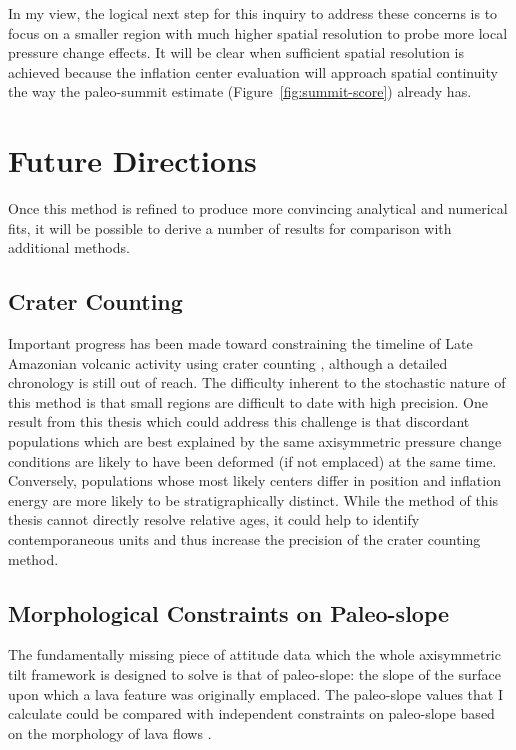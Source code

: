 In my view, the logical next step for this inquiry to address these concerns is to focus on a smaller region with much higher spatial resolution to probe more local pressure change effects. It will be clear when sufficient spatial resolution is achieved because the inflation center evaluation will approach spatial continuity the way the paleo-summit estimate (Figure~\ref{fig:summit-score}) already has.

\section{Future Directions}

Once this method is refined to produce more convincing analytical and numerical fits, it will be possible to derive a number of results for comparison with additional methods.

\subsection{Crater Counting}
Important progress has been made toward constraining the timeline of Late Amazonian volcanic activity using crater counting \parencite{kneissl_map-projection-independent_2011,robbins_volcanic_2011,
robbins_large_2013,
platz_crater-based_2013}, although a detailed chronology is still out of reach. The difficulty inherent to the stochastic nature of this method is that small regions are difficult to date with high precision. One result from this thesis which could address this challenge is that discordant populations which are best explained by the same axisymmetric pressure change conditions are likely to have been deformed (if not emplaced) at the same time. Conversely, populations whose most likely centers differ in position and inflation energy are more likely to be stratigraphically distinct. While the method of this thesis cannot directly resolve relative ages, it could help to identify contemporaneous units and thus increase the precision of the crater counting method.

\subsection{Morphological Constraints on Paleo-slope}

The fundamentally missing piece of attitude data which the whole axisymmetric tilt framework is designed to solve is that of paleo-slope: the slope of the surface upon which a lava feature was originally emplaced. The paleo-slope values that I calculate could be compared with independent constraints on paleo-slope based on the morphology of lava flows \parencite{wadge_lobes_1991, peitersen_correlations_2000, peters_lava_2021}.


